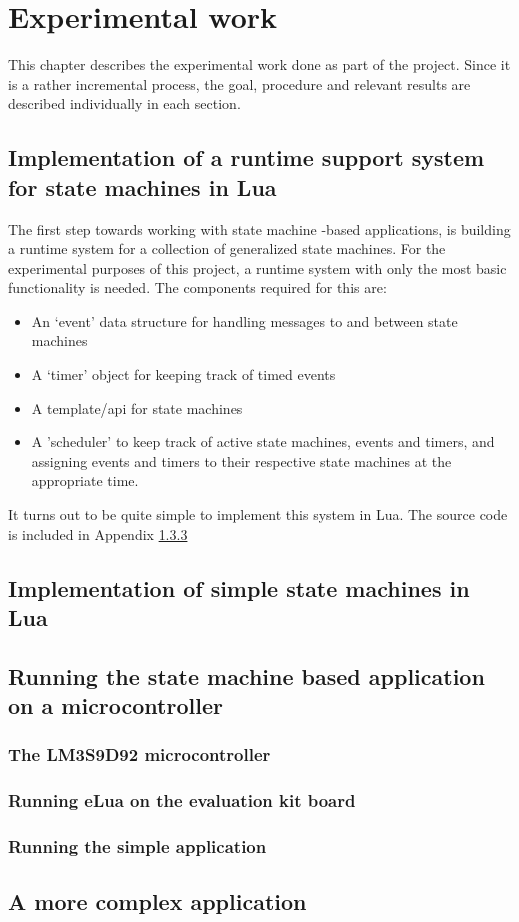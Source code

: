 \chapter{Experimental work}
\label{ch:experimental_work}
This chapter describes the experimental work done as part of the project. Since it is a rather incremental process, the goal, procedure and relevant results are described individually in each section.

\section{Implementation of a runtime support system for state machines in Lua}
\label{sec:impl_runtime_support}
The first step towards working with state machine -based applications, is building a runtime system for a collection of generalized state machines. For the experimental purposes of this project, a runtime system with only the most basic functionality is needed. The components required for this are:

\begin{itemize}
	\item An ‘event’ data structure for handling messages to and between state machines
	\item A ‘timer’ object for keeping track of timed events
	\item A template/\gls{api} for state machines
	\item A 'scheduler' to keep track of active state machines, events and timers, and assigning events and timers to their respective state machines at the appropriate time.
\end{itemize}

It turns out to be quite simple to implement this system in Lua. The source code is included in Appendix \ref{}

\section{Implementation of simple state machines in Lua}
\label{sec:impl_state_machines}

\section{Running the state machine based application on a microcontroller}
\label{sec:running_on_micro}

\subsection{The LM3S9D92 microcontroller}

\subsection{Running eLua on the evaluation kit board}

\subsection{Running the simple application}

\section{A more complex application}
\label{sec:impl_complex_app}
